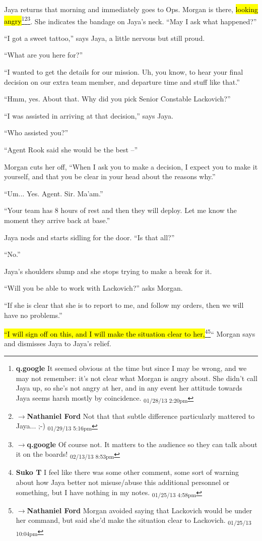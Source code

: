 Jaya returns that morning and immediately goes to Ops.  Morgan is there, \hl{looking angry}\footnote{\textbf{q.google }It seemed obvious at the time but since I may be wrong, and we may not remember: it's not clear what Morgan is angry about.  She didn't call Jaya up, so she's not angry at her, and in any event her attitude towards Jaya seems harsh mostly by coincidence. \textsubscript{01/28/13 2:20pm}}\footnote{$\rightarrow$\textbf{Nathaniel Ford }Not that that subtle difference particularly mattered to Jaya... ;-) \textsubscript{01/29/13 5:16pm}}\footnote{$\rightarrow$\textbf{q.google }Of course not.  It matters to the audience so they can talk about it on the boards! \textsubscript{02/13/13 8:53pm}}.  She indicates the bandage on Jaya's neck. ``May I ask what happened?''

``I got a sweet tattoo,'' says Jaya, a little nervous but still proud.

``What are you here for?''

``I wanted to get the details for our mission.  Uh, you know, to hear your final decision on our extra team member, and departure time and stuff like that.''

``Hmm, yes.  About that.  Why did you pick Senior Constable Lackovich?''

``I was assisted in arriving at that decision,'' says Jaya.

``Who assisted you?''

``Agent Rook said she would be the best --''

Morgan cuts her off, ``When I ask you to make a decision, I expect you to make it yourself, and that you be clear in your head about the reasons why.''

``Um... Yes.  Agent.  Sir.  Ma'am.''

``Your team has 8 hours of rest and then they will deploy.  Let me know the moment they arrive back at base.''

Jaya nods and starts sidling for the door.  ``Is that all?''

``No.''

Jaya's shoulders slump and she stops trying to make a break for it.

``Will you be able to work with Lackovich?'' asks Morgan.

``If she is clear that she is to report to me, and follow my orders, then we will have no problems.''

\hl{``I will sign off on this, and I will make the situation clear to her,}\footnote{\textbf{Suko T }I feel like there was some other comment, some sort of warning about how Jaya better not misuse/abuse this additional personnel or something, but I have nothing in my notes. \textsubscript{01/25/13 4:58pm}}\footnote{$\rightarrow$\textbf{Nathaniel Ford }Morgan avoided saying that Lackovich would be under her command, but said she'd make the situation clear to Lackovich. \textsubscript{01/25/13 10:04pm}}``  Morgan says and dismisses Jaya to Jaya's relief.



